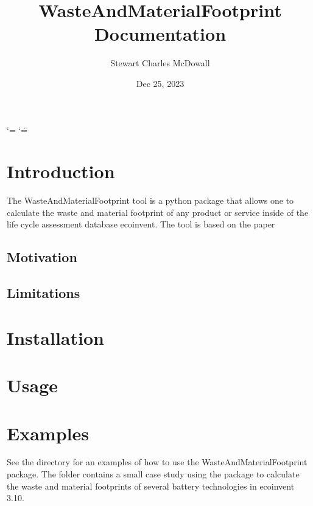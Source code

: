 \documentclass[letterpaper,10pt,english]{sphinxmanual}
\title{WasteAndMaterialFootprint Documentation}
\date{Dec 25, 2023}
\author{Stewart Charles McDowall}
\begin{document}
\ifdefined\shorthandoff
  \ifnum\catcode`\=\string=\active\shorthandoff{=}\fi
  \ifnum\catcode`\"=\active{}\fi
\fi

\pagestyle{empty}
\sphinxmaketitle
\pagestyle{plain}
\sphinxtableofcontents
\pagestyle{normal}
\label{\detokenize{index::doc}}


\sphinxstepscope


\chapter{Introduction}
\label{\detokenize{intro:introduction}}\label{\detokenize{intro::doc}}
\sphinxAtStartPar
The WasteAndMaterialFootprint tool is a python package that allows one to calculate the waste and material footprint of any product or service inside of the life cycle assessment database ecoinvent. The tool is based on the paper


\section{Motivation}
\label{\detokenize{intro:motivation}}

\section{Limitations}
\label{\detokenize{intro:limitations}}
\sphinxstepscope


\chapter{Installation}
\label{\detokenize{installation:installation}}\label{\detokenize{installation::doc}}
\sphinxstepscope


\chapter{Usage}
\label{\detokenize{usage:usage}}\label{\detokenize{usage::doc}}
\sphinxstepscope


\chapter{Examples}
\label{\detokenize{examples:examples}}\label{\detokenize{examples::doc}}
\sphinxAtStartPar
See the  directory for an examples of how to use the WasteAndMaterialFootprint package.
The folder  contains a small case study using the package to calculate the waste and material footprints of several battery technologies in ecoinvent 3.10.
\end{document}
